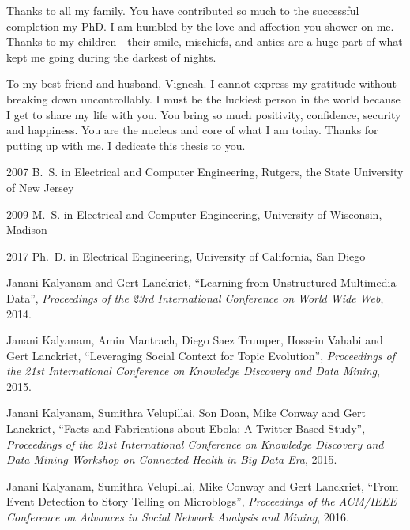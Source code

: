 \begin{frontmatter}
\begin{acknowledgements}
Thanks to all my family.  You have contributed so much to the successful completion my PhD.  I am humbled by the love and affection you shower on me.  Thanks to my children - their smile, mischiefs, and antics are a huge part of what kept me going during the darkest of nights.  

To my best friend and husband, Vignesh.  I cannot express my gratitude without breaking down uncontrollably.  I must be the luckiest person in the world because I get to share my life with you.  You bring so much positivity, confidence, security and happiness.  You are the nucleus and core of what I am today.  Thanks for putting up with me.  I dedicate this thesis to you.

\end{acknowledgements}


%
%
\begin{vitapage}
\begin{vita}
  \item[2007] B.~S. in Electrical and Computer Engineering, Rutgers, the State University of New Jersey
  \item[2009] M.~S. in Electrical and Computer Engineering, University of Wisconsin, Madison
  \item[2017] Ph.~D. in Electrical Engineering, University of California, San Diego
\end{vita}
\begin{publications}
  \item Janani Kalyanam and Gert Lanckriet, ``Learning from Unstructured Multimedia Data'', \emph{Proceedings of the 23rd International Conference on World Wide Web}, 2014.
  \item Janani Kalyanam, Amin Mantrach, Diego Saez Trumper, Hossein Vahabi and Gert Lanckriet, ``Leveraging Social Context for Topic Evolution'', \emph{Proceedings of the 21st International Conference on Knowledge Discovery and Data Mining}, 2015.
  \item Janani Kalyanam, Sumithra Velupillai, Son Doan, Mike Conway and Gert Lanckriet, ``Facts and Fabrications about Ebola: A Twitter Based Study'', \emph{Proceedings of the 21st International Conference on Knowledge Discovery and Data Mining Workshop on Connected Health in Big Data Era}, 2015.
  \item Janani Kalyanam, Sumithra Velupillai, Mike Conway and Gert Lanckriet, ``From Event Detection to Story Telling on Microblogs'', \emph{Proceedings of the ACM/IEEE Conference on Advances in Social Network Analysis and Mining}, 2016.

\end{publications}
\end{vitapage}
\end{frontmatter}
